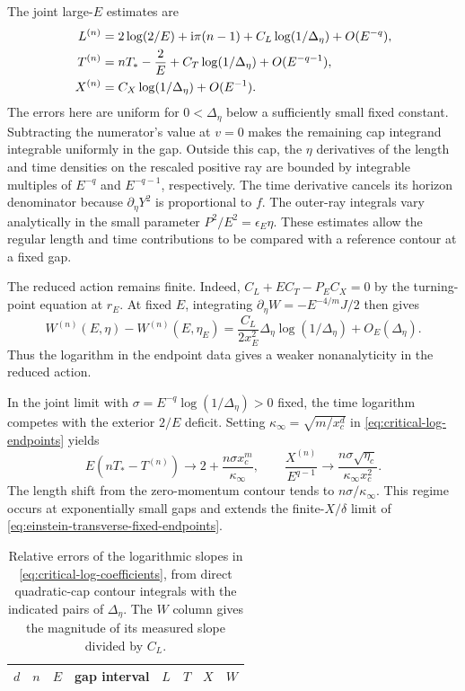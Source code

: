 The joint large-\(E\) estimates are
\begin{align}
 L^{(n)}&=2\log(2/E)+\mathrm{i}\pi(n-1)
           +C_L\log(1/\Delta_\eta)+O(E^{-q}),\notag\\
 T^{(n)}&=nT_*-\frac2E
           +C_T\log(1/\Delta_\eta)+O(E^{-q-1}),\notag\\
 X^{(n)}&=C_X\log(1/\Delta_\eta)+O(E^{-1}).
 \label{eq:critical-log-endpoints}
\end{align}
The errors here are uniform for \(0<\Delta_\eta\) below a
sufficiently small fixed constant. Subtracting the numerator's
value at \(v=0\) makes the remaining cap integrand integrable
uniformly in the gap. Outside this cap, the \(\eta\) derivatives
of the length and time densities on the rescaled positive ray
are bounded by integrable multiples of \(E^{-q}\) and
\(E^{-q-1}\), respectively. The time derivative cancels its
horizon denominator because \(\partial_\eta Y^2\) is proportional
to \(f\). The outer-ray integrals vary analytically in the
small parameter \(P^2/E^2=\epsilon_E\eta\). These estimates
allow the regular length and time contributions to be compared
with a reference contour at a fixed gap.

The reduced action remains finite. Indeed,
\(C_L+EC_T-P_E C_X=0\) by the turning-point equation at \(r_E\).
At fixed \(E\), integrating \(\partial_\eta W=-E^{-4/m}J/2\)
then gives
\begin{equation}
 W^{(n)}(E,\eta)-W^{(n)}(E,\eta_E)=
 \frac{C_L}{2x_E^2}\Delta_\eta\log(1/\Delta_\eta)
    +O_E(\Delta_\eta).
\end{equation}
Thus the logarithm in the endpoint data gives a weaker
nonanalyticity in the reduced action.

In the joint limit with \(\sigma=E^{-q}\log(1/\Delta_\eta)>0\)
fixed, the time logarithm competes with the exterior
\(2/E\) deficit. Setting \(\kappa_\infty=\sqrt{m/x_c^d}\)
in \eqref{eq:critical-log-endpoints} yields
\begin{equation}
 E(nT_*-T^{(n)})\longrightarrow
        2+\frac{n\sigma x_c^m}{\kappa_\infty},
 \qquad
 \frac{X^{(n)}}{E^{q-1}}\longrightarrow
        \frac{n\sigma\sqrt{\eta_c}}{\kappa_\infty x_c^2}.
\end{equation}
The length shift from the zero-momentum contour tends to
\(n\sigma/\kappa_\infty\). This regime occurs at exponentially
small gaps and extends the finite-\(X/\delta\) limit of
\eqref{eq:einstein-transverse-fixed-endpoints}.

\begin{table}[t]
 \centering\small
 \begin{tabular}{cccccccc}
 \hline
 \(d\) & \(n\) & \(E\) & gap interval & \(L\) & \(T\) & \(X\) & \(W\) \\
 \hline
 
 \end{tabular}
 \caption{Relative errors of the logarithmic slopes
 in \eqref{eq:critical-log-coefficients}, from direct quadratic-cap
 contour integrals with the indicated pairs of \(\Delta_\eta\).
 The \(W\) column gives the magnitude of its measured slope
 divided by \(C_L\).}
 \label{tab:critical-transverse-geodesic}
\end{table}

